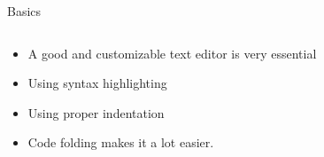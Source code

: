 \documentclass[aspectratio=169]{beamer}
\begin{document}
%
\begin{frame}{Basics}
    \begin{columns}
        \begin{column}{0.39\textwidth}
            \begin{itemize}
                \item<1-> A good and customizable text editor is very essential
                \item<1-> Using syntax highlighting
                \item<1-> Using proper indentation
                \item<1-> Code folding makes it a lot easier.
            \end{itemize}
        \end{column}
        \begin{column}{0.59\textwidth}
            \begin{columns}
                \begin{column}{0.49\textwidth}
                \end{column}
                \begin{column}{0.49\textwidth}
                \end{column}
            \end{columns}
        \end{column}
    \end{columns}
\end{frame} 
%
%
%
\end{document}
